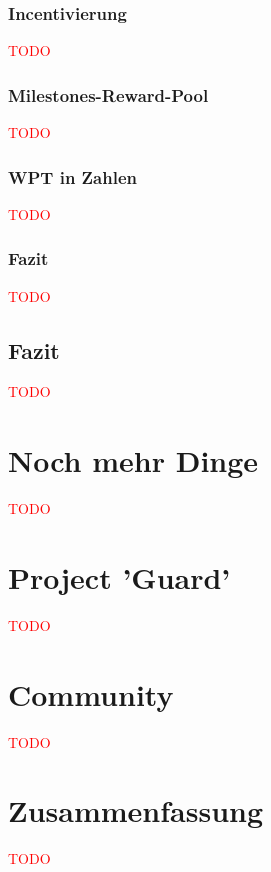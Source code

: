 \documentclass[11pt]{scrartcl}
\newcommand\todo[1]{\textcolor{red}{#1}}
\begin{document}
\subsubsection{Incentivierung}
\label{sec:wpt_incent}
\todo{TODO}

\subsubsection{Milestones-Reward-Pool}
\label{sec:wpt_reward_pool}
\todo{TODO}

\subsubsection{WPT in Zahlen}
\label{sec:wpt_zahlen}
\todo{TODO}

\subsubsection{Fazit}
\label{sec:wpt_fazit}
\todo{TODO}


\subsection{Fazit}
\label{sec:eco_fazit}
\todo{TODO}





\section{Noch mehr Dinge}
\label{sec:dinge2}
\todo{TODO}





\section{Project 'Guard'}
\label{sec:guard}
\todo{TODO}





\section{Community}
\label{sec:community}
\todo{TODO}



\section{Zusammenfassung}
\label{sec:fazit}
\todo{TODO}



 
 
\end{document}
